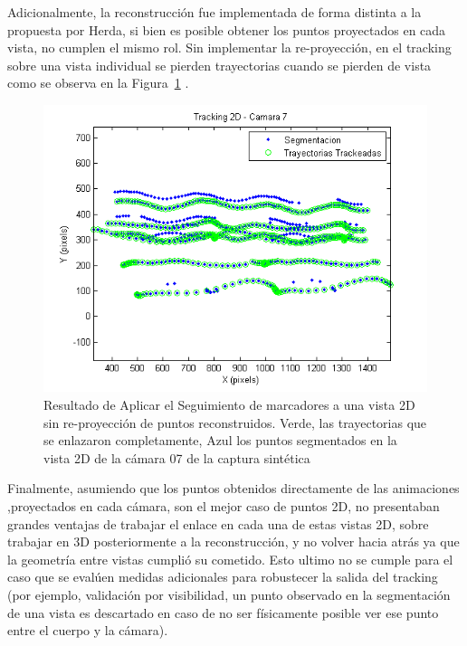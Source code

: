 Adicionalmente, la reconstrucción fue implementada de forma distinta a la propuesta por Herda, si bien es posible obtener los puntos proyectados en cada vista, no cumplen el mismo rol. Sin implementar la re-proyección, en el tracking sobre una vista individual se pierden trayectorias cuando se pierden de vista como se observa en la Figura~\ref{tracking_2D_cam_07} .
\vspace{-0.2cm}
\begin{figure}[hbt]
\begin{center}
\includegraphics[scale=0.7]{img/Tracking/011_tracking_2D_camara_07.png}
\end{center}
\vspace{-0.8cm}
\caption{Resultado de Aplicar el Seguimiento de marcadores a una vista 2D sin re-proyección de puntos reconstruidos. Verde, las trayectorias que se enlazaron completamente, Azul los puntos segmentados en la vista 2D de la cámara 07 de la captura sintética}
\label{tracking_2D_cam_07}
\end{figure}

Finalmente, asumiendo que los puntos obtenidos directamente de las animaciones ,proyectados en cada cámara, son el mejor caso de puntos 2D, no presentaban grandes ventajas de trabajar el enlace en cada una de estas vistas 2D, sobre trabajar en 3D posteriormente a la reconstrucción, y no volver hacia atrás ya que la geometría entre vistas cumplió su cometido. Esto ultimo no se cumple para el caso que se evalúen medidas adicionales para robustecer la salida del tracking (por ejemplo, validación por visibilidad, un punto observado en la segmentación de una vista es descartado en caso de no ser físicamente posible ver ese punto entre el cuerpo y la cámara).

